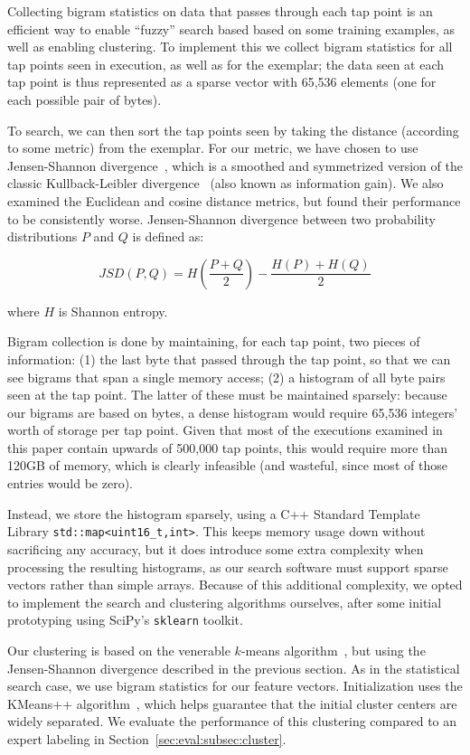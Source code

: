 Collecting bigram statistics on data that passes through each tap point
is an efficient way to enable ``fuzzy'' search based based on some
training examples, as well as enabling clustering. To implement this
we collect bigram statistics for all tap points seen in execution, as
well as for the exemplar; the data seen at each tap point is thus
represented as a sparse vector with 65,536 elements (one for each
possible pair of bytes).

To search, we can then sort the tap points seen by taking the distance
(according to some metric) from the exemplar. For our metric, we have
chosen to use Jensen-Shannon divergence~\cite{Lin:2006fk}, which is a
smoothed and symmetrized version of the classic Kullback-Leibler
divergence~\cite{Kullback:1951uq} (also known as information gain). We
also examined the Euclidean and cosine distance metrics, but found their
performance to be consistently worse. Jensen-Shannon
divergence between two probability distributions $P$ and $Q$ is defined
as:

\[
JSD(P, Q) = H \left ( \frac{P+Q}{2} \right ) - \frac{H(P)+H(Q)}{2}
\]

\noindent where $H$ is Shannon entropy.

Bigram collection is done by maintaining, for each tap point, two pieces
of information: (1) the last byte that passed through the tap point,
so that we can see bigrams that span a single memory access; (2) a
histogram of all byte pairs seen at the tap point. The latter of these
must be maintained sparsely: because our bigrams are based on bytes, a
dense histogram would require 65,536 integers' worth of storage per tap
point. Given that most of the executions examined in this paper contain
upwards of 500,000 tap points, this would require more than 120GB of
memory, which is clearly infeasible (and wasteful, since most of those
entries would be zero).

Instead, we store the histogram sparsely, using a C++ Standard Template
Library \texttt{std::map<uint16\_t,int>}. This keeps memory usage down
without sacrificing any accuracy, but it does introduce some extra
complexity when processing the resulting histograms, as our search
software must support sparse vectors rather than simple arrays. Because
of this additional complexity, we opted to implement the search and
clustering algorithms ourselves, after some initial prototyping using
SciPy's \texttt{sklearn} toolkit.

Our clustering is based on the venerable $k$-means
algorithm~\cite{Steinhaus:1956kx}, but using the Jensen-Shannon
divergence described in the previous section. As in the statistical
search case, we use bigram statistics for our feature vectors.
Initialization uses the KMeans++ algorithm~\cite{Arthur:2007ve}, which
helps guarantee that the initial cluster centers are widely separated.
We evaluate the performance of this clustering compared to an expert
labeling in Section~\ref{sec:eval:subsec:cluster}.


